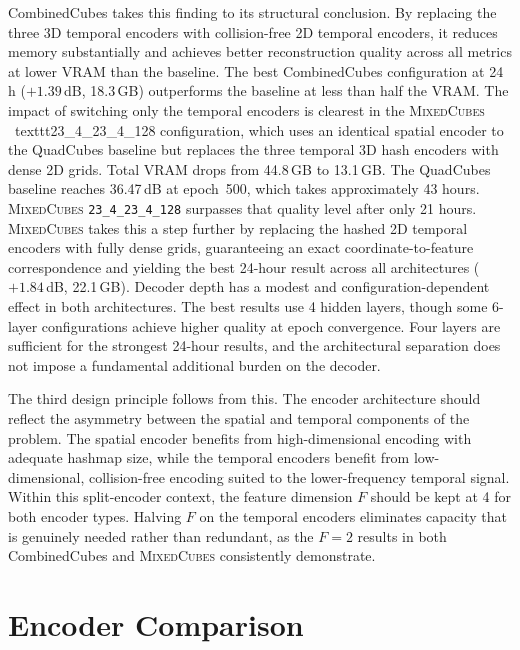 \documentclass[12pt, a4paper, twoside]{report}
\newcommand{\MixedCubes}{\textsc{MixedCubes}}
\begin{document}
CombinedCubes takes this finding to its structural conclusion. By replacing the three 3D temporal encoders with collision-free 2D temporal encoders, it reduces memory substantially and achieves better reconstruction quality across all metrics at lower VRAM than the baseline. The best CombinedCubes configuration at 24\,h ($+1.39$\,dB, 18.3\,GB) outperforms the baseline at less than half the VRAM. The impact of switching only the temporal encoders is clearest in the \MixedCubes{} \ texttt{23\_4\_23\_4\_128} configuration, which uses an identical spatial encoder to the QuadCubes baseline but replaces the three temporal 3D hash encoders with dense 2D grids. Total VRAM drops from 44.8\,GB to 13.1\,GB. The QuadCubes baseline reaches 36.47\,dB at epoch~500, which takes approximately 43 hours. \MixedCubes{} \texttt{23\_4\_23\_4\_128} surpasses that quality level after only 21 hours. \MixedCubes{} takes this a step further by replacing the hashed 2D temporal encoders with fully dense grids, guaranteeing an exact coordinate-to-feature correspondence and yielding the best 24-hour result across all architectures ($+1.84$\,dB, 22.1\,GB). Decoder depth has a modest and configuration-dependent effect in both architectures. The best results use 4 hidden layers, though some 6-layer configurations achieve higher quality at epoch convergence. Four layers are sufficient for the strongest 24-hour results, and the architectural separation does not impose a fundamental additional burden on the decoder.

The third design principle follows from this. The encoder architecture should reflect the asymmetry between the spatial and temporal components of the problem. The spatial encoder benefits from high-dimensional encoding with adequate hashmap size, while the temporal encoders benefit from low-dimensional, collision-free encoding suited to the lower-frequency temporal signal. Within this split-encoder context, the feature dimension $F$ should be kept at 4 for both encoder types. Halving $F$ on the temporal encoders eliminates capacity that is genuinely needed rather than redundant, as the $F = 2$ results in both CombinedCubes and \MixedCubes{} consistently demonstrate.

\chapter{Encoder Comparison}
\label{chap:encoder_comparison}
\end{document}
